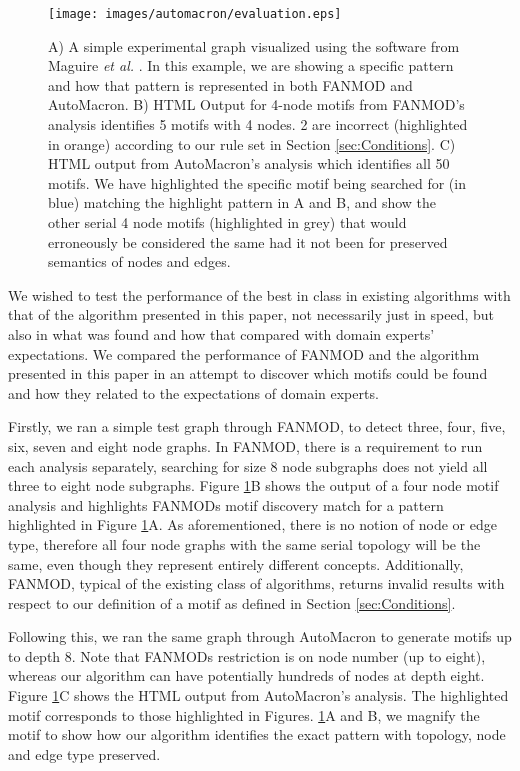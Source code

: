 \begin{figure}[ht!]
\centering
\texttt{[image: images/automacron/evaluation.eps]}
\caption{A) A simple experimental graph visualized using the software from Maguire \emph{et al.} \cite{Maguire:2012:TVCG}. In this example, we are showing a specific pattern and how that pattern is represented in both FANMOD and AutoMacron. B) HTML Output for 4-node motifs from FANMOD's analysis identifies 5 motifs with 4 nodes. 2 are incorrect (highlighted in orange) according to our rule set in Section \ref{sec:Conditions}. C) HTML output from AutoMacron's analysis which identifies all 50 motifs. We have highlighted the specific motif being searched for (in blue) matching the highlight pattern in A and B, and show the other serial 4 node motifs (highlighted in grey) that would erroneously be considered the same had it not been for preserved semantics of nodes and edges.}
\vspace{-4mm}
\label{fig:evaluation}
\end{figure}

We wished to test the performance of the best in class in existing algorithms with that of the algorithm presented in this paper, not necessarily just in speed, but also in what was found and how that compared with domain experts' expectations.
We compared the performance of FANMOD \cite{wernicke06} and the algorithm presented in this paper in an attempt to discover which motifs could be found and how they related to the expectations of domain experts.

Firstly, we ran a simple test graph through FANMOD, to detect three, four, five, six, seven and eight node graphs.
In FANMOD, there is a requirement to run each analysis separately, searching for size 8 node subgraphs does not yield all three to eight node subgraphs.
Figure \ref{fig:evaluation}B shows the output of a four node motif analysis and highlights FANMODs motif discovery match for a pattern highlighted in Figure \ref{fig:evaluation}A.
As aforementioned, there is no notion of node or edge type, therefore all four node graphs with the same serial topology will be the same, even though they represent entirely different concepts.
Additionally, FANMOD, typical of the existing class of algorithms, returns invalid results with respect to our definition of a motif as defined in Section \ref{sec:Conditions}.

Following this, we ran the same graph through AutoMacron to generate motifs up to depth 8. Note that FANMODs restriction is on node number (up to eight), whereas our algorithm can have potentially hundreds of nodes at depth eight. Figure \ref{fig:evaluation}C shows the HTML output from AutoMacron's analysis. The highlighted motif corresponds to those highlighted in Figures. \ref{fig:evaluation}A and B, we magnify the motif to show how our algorithm identifies the exact pattern with topology, node and edge type preserved.

